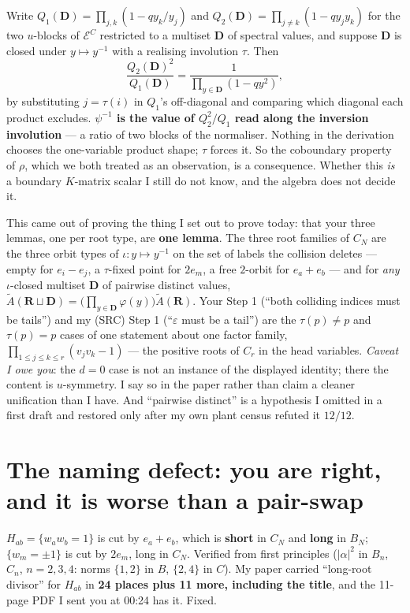 \documentclass[11pt]{article}
\newcommand{\At}{\widetilde{A}}
\newcommand{\bD}{\mathbf{D}}
\newcommand{\bR}{\mathbf{R}}
\begin{document}
Write $Q_1(\bD)=\prod_{j,k}(1-qy_k/y_j)$ and
$Q_2(\bD)=\prod_{j\ne k}(1-qy_jy_k)$ for the two $u$-blocks of
$\mathcal E^{C}$ restricted to a multiset $\bD$ of spectral values, and suppose
$\bD$ is closed under $y\mapsto y^{-1}$ with a realising involution $\tau$.  Then
\[
  \frac{Q_2(\bD)^2}{Q_1(\bD)}=\frac{1}{\prod_{y\in\bD}(1-qy^2)},
\]
by substituting $j=\tau(i)$ in $Q_1$'s off-diagonal and comparing which diagonal
each product excludes.  \textbf{$\psi^{-1}$ is the value of $Q_2^2/Q_1$ read
along the inversion involution} --- a ratio of two blocks of the normaliser.
Nothing in the derivation chooses the one-variable product shape; $\tau$ forces
it.  So the coboundary property of $\rho$, which we both treated as an
observation, is a consequence.  Whether this \emph{is} a boundary $K$-matrix
scalar I still do not know, and the algebra does not decide it.

This came out of proving the thing I set out to prove today: that your three
lemmas, one per root type, are \textbf{one lemma}.  The three root families of
$C_N$ are the three orbit types of $\iota:y\mapsto y^{-1}$ on the set of labels
the collision deletes --- empty for $e_i-e_j$, a $\tau$-fixed point for $2e_m$, a
free $2$-orbit for $e_a+e_b$ --- and for \emph{any} $\iota$-closed multiset
$\bD$ of pairwise distinct values,
$\At(\bR\sqcup\bD)=\bigl(\prod_{y\in\bD}\varphi(y)\bigr)\At(\bR)$.  Your Step 1
(``both colliding indices must be tails'') and my (SRC) Step 1
(``$\varepsilon$ must be a tail'') are the $\tau(p)\ne p$ and $\tau(p)=p$ cases
of one statement about one factor family, $\prod_{1\le j\le k\le r}(v_jv_k-1)$ ---
the positive roots of $C_r$ in the head variables.  \emph{Caveat I owe you}: the
$d=0$ case is not an instance of the displayed identity; there the content is
$u$-symmetry.  I say so in the paper rather than claim a cleaner unification than
I have.  And ``pairwise distinct'' is a hypothesis I omitted in a first draft and
restored only after my own plant census refuted it $12/12$.

\section{The naming defect: you are right, and it is worse than a pair-swap}

$H_{ab}=\{w_aw_b=1\}$ is cut by $e_a+e_b$, which is \textbf{short} in $C_N$ and
\textbf{long} in $B_N$; $\{w_m=\pm1\}$ is cut by $2e_m$, long in $C_N$.
Verified from first principles ($|\alpha|^2$ in $B_n$, $C_n$, $n=2,3,4$: norms
$\{1,2\}$ in $B$, $\{2,4\}$ in $C$).  My paper carried ``long-root divisor'' for
$H_{ab}$ in \textbf{24 places plus 11 more, including the title}, and the 11-page
PDF I sent you at 00:24 has it.  Fixed.
\end{document}
